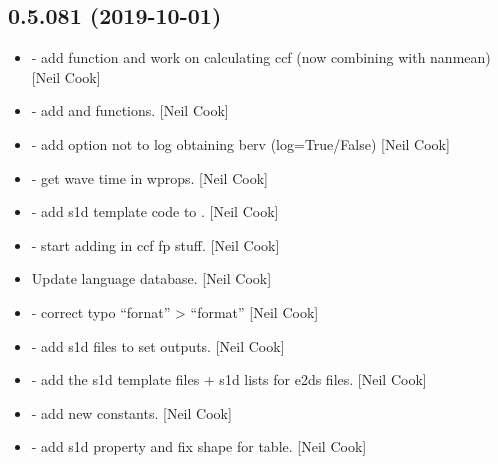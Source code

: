 \documentclass[a4paper,10pt,english]{report}
\begin{document}
\subsection{0.5.081 (2019-10-01)}
\label{\detokenize{misc/changelog:id61}}\begin{itemize}
\item {} 
 - add  function and
work on calculating ccf (now combining with nanmean) {[}Neil Cook{]}

\item {} 
 - add  and
 functions. {[}Neil Cook{]}

\item {} 
 - add option not to log obtaining berv
(log=True/False) {[}Neil Cook{]}

\item {} 
 - get wave time in wprops. {[}Neil Cook{]}

\item {} 
 - add s1d template code to
. {[}Neil Cook{]}

\item {} 
 - start adding in ccf fp stuff. {[}Neil
Cook{]}

\item {} 
Update language database. {[}Neil Cook{]}

\item {} 
 - correct typo “fornat” \textendash{}\textgreater{} “format” {[}Neil Cook{]}

\item {} 
 - add s1d files to set
outputs. {[}Neil Cook{]}

\item {} 
 - add the s1d template
files + s1d lists for e2ds files. {[}Neil Cook{]}

\item {} 
 - add new 
constants. {[}Neil Cook{]}

\item {} 
 - add s1d property and fix shape for table.
{[}Neil Cook{]}

\end{itemize}
\end{document}
